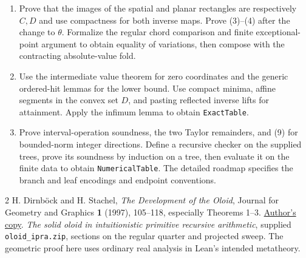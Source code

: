 \documentclass[11pt,letterpaper]{article}
\begin{document}
\begin{enumerate}[itemsep=2pt]
\item Prove that the images of the spatial and planar rectangles are respectively $C,D$ and use compactness for both inverse maps. Prove (3)--(4) after the change to $\theta$. Formalize the regular chord comparison and finite exceptional-point argument to obtain equality of variations, then compose with the contracting absolute-value fold.
\item Use the intermediate value theorem for zero coordinates and the generic ordered-hit lemmas for the lower bound. Use compact minima, affine segments in the convex set $D$, and pasting reflected inverse lifts for attainment. Apply the infimum lemma to obtain \texttt{ExactTable}.
\item Prove interval-operation soundness, the two Taylor remainders, and (9) for bounded-norm integer directions. Define a recursive checker on the supplied trees, prove its soundness by induction on a tree, then evaluate it on the finite data to obtain \texttt{NumericalTable}. The detailed roadmap specifies the branch and leaf encodings and endpoint conventions.
\end{enumerate}

\small
\begin{thebibliography}{2}
 H. Dirnböck and H. Stachel, \emph{The Development of the Oloid}, Journal for Geometry and Graphics \textbf{1} (1997), 105--118, especially Theorems 1--3. \href{https://www.geometrie.tuwien.ac.at/stachel/jgg0113.pdf}{Author's copy}.
 \emph{The solid oloid in intuitionistic primitive recursive arithmetic}, supplied \texttt{oloid\_ipra.zip}, sections on the regular quarter and projected sweep. The geometric proof here uses ordinary real analysis in Lean's intended metatheory.
\end{thebibliography}
\end{document}
